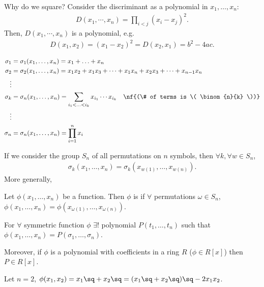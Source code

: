 \documentclass[a4paper]{article}
\begin{document}
Why do we square? Consider the discriminant as a polynomial in \( x_1,\ldots,x_n \):
\begin{align*}
  D(x_1,\cdots,x_n) = \prod_{i<j}(x_i-x_j)^2.
\end{align*}
Then, \( D(x_1,\cdots,x_n) \) is a  polynomial, e.g. \begin{align*}
  D(x_1,x_2) = (x_1-x_2)^2 = D(x_2,x_1) = b^2-4ac.
\end{align*}

\begin{tdefinition}
  \begin{align*}
    \sigma_1 &= \sigma_1(x_1,\ldots, x_n)= x_1+\ldots+x_n \\
    \sigma_2 &= \sigma_2(x_1,\ldots, x_n)= x_1x_2+x_1x_3+\cdots+x_1x_n+x_2x_3+\cdots+x_{n-1}x_n \\
    \vdots \\
    \sigma_k &= \sigma_n(x_1,\ldots, x_n)= \sum_{i_1<\ldots<i_ k} x_{i_1}\cdots x_{i_k} \quad \nf {(\# of terms is \( \binom{n}{k} \))} \\
    \vdots \\
    \sigma_n &= \sigma_n(x_1,\ldots, x_n)= \prod_{i=1}^{n} x_i
  \end{align*}
\end{tdefinition}

If we consider the group \( S_n \) of all permutations on \( n \) symbols, then \( \forall k, \forall w\in S_n \), \begin{align*}
  \sigma_k(x_1,\ldots,x_n) = \sigma_k(x_{w(1)},\ldots,x_{w(n)}).
\end{align*}
More generally,
\begin{tdefinition}
  Let \( \phi(x_1, \ldots, x_n) \) be a function. Then \( \phi \) is  if \( \forall \) permutations \( \omega\in S_n \), \( \phi(x_1,\ldots, x_n) = \phi(x_{\omega(1)},\ldots,x_{\omega(n)})\).
\end{tdefinition}

\begin{ttheorem} For \( \forall \) symmetric function \( \phi \) \( \exists ! \) polynomial \( P(t_1, \ldots,t_n) \) such that \( \phi(x_1,\ldots,x_n) =P(\sigma_1,\ldots,\sigma_n)\).

Moreover, if \( \phi \) is a polynomial with coefficients in a ring \( R \) (\( \phi\in R[x] \)) then \( P\in R[x] \).
\end{ttheorem}

\begin{example}
  Let \( n=2 \), \( \phi(x_1,x_2) = x_1\sq+x_2\sq = (x_1\sq+x_2\sq)\sq - 2x_1x_2 \).
\end{example}
\end{document}
